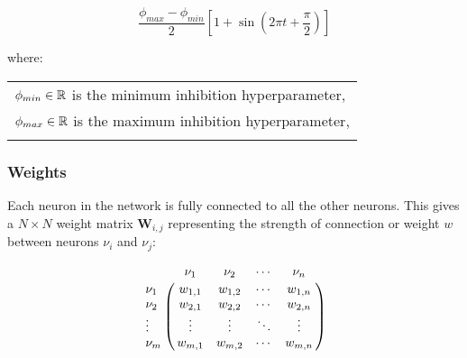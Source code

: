 
        \begin{equation}
            \frac{\phi_{max} - \phi_{min}}{2} \left[1 +  \sin \left(2 \pi t + \frac{\pi}{2} \right) \right]
        \end{equation}
        
        where:

        \begin{tabular}{l} \\
            \(\phi_{min} \in \mathbb{R}\) is the minimum inhibition hyperparameter, \\
            \(\phi_{max} \in \mathbb{R}\) is the maximum inhibition hyperparameter, \\
        \label{tab:conditions_sine_wave} \end{tabular} \bigskip


\subsubsection{Weights}


    Each neuron in the network is fully connected to all the other neurons.
    This gives a \(N \times N\) weight matrix \(\boldsymbol{W}_{i, j}\) representing the strength of connection or weight \(w\) between neurons \(\nu_{i}\) and \(\textit{}\nu_{j}\):

    \[\bordermatrix{
        ~ & \nu_1 & \nu_2 & \cdots & \nu_n  \cr
        \nu_1 &  w_{1, 1} & w_{1, 2} & \cdots & w_{1, n}  \cr
        \nu_2 &  w_{2, 1} & w_{2, 2} & \cdots & w_{2, n}  \cr
        \vdots &  \vdots  & \vdots & \ddots & \vdots  \cr
        \nu_m &  w_{m, 1} & w_{m, 2} & \cdots & w_{m, n}
    }\] \bigskip



